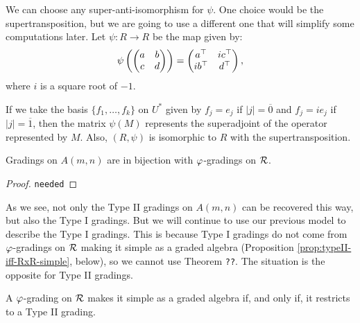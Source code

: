We can choose any super-anti-isomorphism for $\psi$. One choice would be the supertransposition, but we are going to use a different one that will simplify some computations later. Let $\psi: R \to R$ be the map given by:
\[
    \psi\left(
    \begin{pmatrix}
        a & b\\
        c & d
    \end{pmatrix}\right) = 
    \begin{pmatrix}
        a^{\top} & i c^{\top}\\
        i b^{\top} & d^{\top}
    \end{pmatrix},
\]
where $i$ is a square root of $-1$.

\begin{remark}
    If we take the basis $\{f_1, \ldots, f_k\}$ on $U^*$ given by $f_j = e_j $ if $|j| = \overline 0$ and $f_j = ie_j$ if $|j| = \overline 1$, then the matrix $\psi (M)$ represents the superadjoint of the operator represented by $M$. Also, $(R, \psi)$ is isomorphic to $R$ with the supertransposition.
\end{remark}

\begin{prop}
    Gradings on $A(m,n)$ are in bijection with $\varphi$-gradings on $\mathcal R$.
\end{prop}

\begin{proof}
    {\tt needed}
\end{proof}

As we see, not only the Type II gradings on $A(m,n)$ can be recovered this way, but also the Type I gradings. But we will continue to use our previous model to describe the Type I gradings. This is because Type I gradings do not come from $\varphi$-gradings on $\mathcal R$ making it simple as a graded algebra (Proposition \ref{prop:typeII-iff-RxR-simple}, below), so we cannot use Theorem {\tt ??}. The situation is the opposite for Type II gradings.

\begin{prop}\label{prop:typeII-iff-RxR-simple}
    A $\varphi$-grading on $\mathcal R$ makes it simple as a graded algebra if, and only if, it restricts to a Type II grading.
\end{prop}

